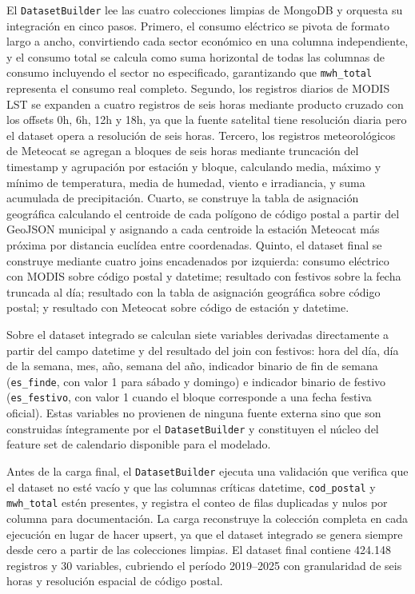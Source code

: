 \documentclass[12pt, a4paper]{article}
\begin{document}
El \texttt{DatasetBuilder} lee las cuatro colecciones limpias de MongoDB y orquesta su integración en cinco pasos. Primero, el consumo eléctrico se pivota de formato largo a ancho, convirtiendo cada sector económico en una columna independiente, y el consumo total se calcula como suma horizontal de todas las columnas de consumo incluyendo el sector no especificado, garantizando que \texttt{mwh\_total} representa el consumo real completo. Segundo, los registros diarios de MODIS LST se expanden a cuatro registros de seis horas mediante producto cruzado con los offsets 0h, 6h, 12h y 18h, ya que la fuente satelital tiene resolución diaria pero el dataset opera a resolución de seis horas. Tercero, los registros meteorológicos de Meteocat se agregan a bloques de seis horas mediante truncación del timestamp y agrupación por estación y bloque, calculando media, máximo y mínimo de temperatura, media de humedad, viento e irradiancia, y suma acumulada de precipitación. Cuarto, se construye la tabla de asignación geográfica calculando el centroide de cada polígono de código postal a partir del GeoJSON municipal y asignando a cada centroide la estación Meteocat más próxima por distancia euclídea entre coordenadas. Quinto, el dataset final se construye mediante cuatro joins encadenados por izquierda: consumo eléctrico con MODIS sobre código postal y datetime; resultado con festivos sobre la fecha truncada al día; resultado con la tabla de asignación geográfica sobre código postal; y resultado con Meteocat sobre código de estación y datetime.

Sobre el dataset integrado se calculan siete variables derivadas directamente a partir del campo datetime y del resultado del join con festivos: hora del día, día de la semana, mes, año, semana del año, indicador binario de fin de semana (\texttt{es\_finde}, con valor 1 para sábado y domingo) e indicador binario de festivo (\texttt{es\_festivo}, con valor 1 cuando el bloque corresponde a una fecha festiva oficial). Estas variables no provienen de ninguna fuente externa sino que son construidas íntegramente por el \texttt{DatasetBuilder} y constituyen el núcleo del feature set de calendario disponible para el modelado.

Antes de la carga final, el \texttt{DatasetBuilder} ejecuta una validación que verifica que el dataset no esté vacío y que las columnas críticas datetime, \texttt{cod\_postal} y \texttt{mwh\_total} estén presentes, y registra el conteo de filas duplicadas y nulos por columna para documentación. La carga reconstruye la colección completa en cada ejecución en lugar de hacer upsert, ya que el dataset integrado se genera siempre desde cero a partir de las colecciones limpias. El dataset final contiene 424.148 registros y 30 variables, cubriendo el período 2019--2025 con granularidad de seis horas y resolución espacial de código postal.
\end{document}
